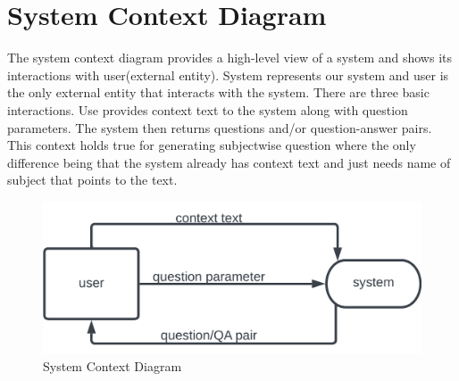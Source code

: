 \documentclass[12pt]{report}
\begin{document}
\section{System Context Diagram}


The system context diagram provides a high-level view of a system and shows its interactions with user(external entity). System represents our system and user is the only external entity that interacts with the system. There are three basic interactions. Use provides context text to the system along with question parameters. The system then returns questions and/or question-answer pairs. This context holds true for generating subjectwise question where the only difference being that the system already has context text and just needs name of subject that points to the text.
\begin{figure}[ht!]
    \centering
    \includegraphics[scale = 1]{Images/Context.png}
    \caption{System Context Diagram}
\end{figure}
\end{document}
